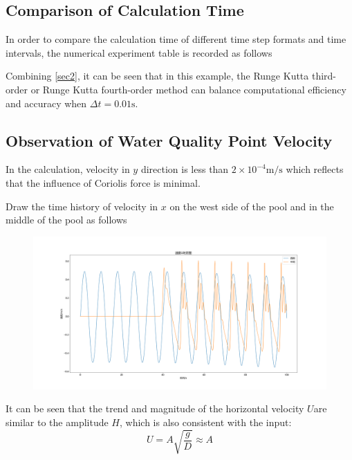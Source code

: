 \documentclass[10pt,a4paper]{article}
\begin{document}
\subsection{Comparison of Calculation Time}
In order to compare the calculation time of different time step formats and time intervals, the numerical experiment table is recorded as follows

\newpage
Combining \ref{sec2}, it can be seen that in this example, the Runge Kutta third-order or Runge Kutta fourth-order method can balance computational efficiency and accuracy when $\Delta t=0.01\mbox{s}$.

\subsection{Observation of Water Quality Point Velocity}

In the calculation, velocity in $y$ direction is less than $2\times10^{-4}\mbox{m/s}$ which reflects that the influence of Coriolis force is minimal.

Draw the time history of velocity in $x$ on the west side of the pool and in the middle of the pool as follows
\begin{figure}[htbp]
	\includegraphics[width=\textwidth]{velocity.png}
\end{figure}

It can be seen that the trend and magnitude of the horizontal velocity $U $are similar to the amplitude $H $, which is also consistent with the input:
\begin{equation}
	U = A\sqrt{\frac{g}{D}} \approx A
\end{equation}
\end{document}
